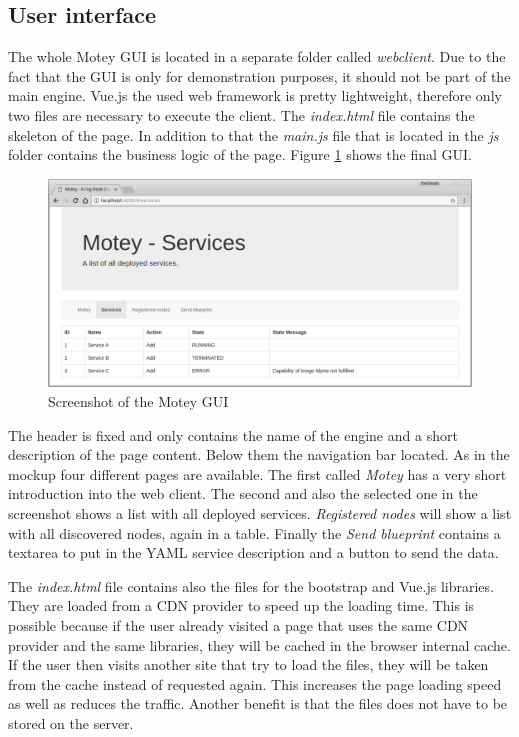 \subsection{User interface}
The whole Motey \ac{GUI} is located in a separate folder called \textit{webclient}.
Due to the fact that the \ac{GUI} is only for demonstration purposes, it should not be part of the main engine.
Vue.js the used web framework is pretty lightweight, therefore only two files are necessary to execute the client.
The \textit{index.html} file contains the skeleton of the page.
In addition to that the \textit{main.js} file that is located in the \textit{js} folder contains the business logic of the page.
Figure \ref{fig:motey_gui_screenshot} shows the final \ac{GUI}.
\begin{figure}[H]
    \centering
    \includegraphics[width=\textwidth]{resources/images/motey_gui_screenshot.png}
    \caption[Screenshot of the Motey \ac{GUI}]{Screenshot of the Motey \ac{GUI}}
    \label{fig:motey_gui_screenshot}
\end{figure}
The header is fixed and only contains the name of the engine and a short description of the page content.
Below them the navigation bar located.
As in the mockup four different pages are available.
The first called \textit{Motey} has a very short introduction into the web client.
The second and also the selected one in the screenshot shows a list with all deployed services.
\textit{Registered nodes} will show a list with all discovered nodes, again in a table.
Finally the \textit{Send blueprint} contains a textarea to put in the \ac{YAML} service description and a button to send the data.\newline

The \textit{index.html} file contains also the files for the bootstrap and Vue.js libraries.
They are loaded from a \ac{CDN} provider to speed up the loading time.
This is possible because if the user already visited a page that uses the same \ac{CDN} provider and the same libraries, they will be cached in the browser internal cache.
If the user then visits another site that try to load the files, they will be taken from the cache instead of requested again.
This increases the page loading speed as well as reduces the traffic.
Another benefit is that the files does not have to be stored on the server.\newline

